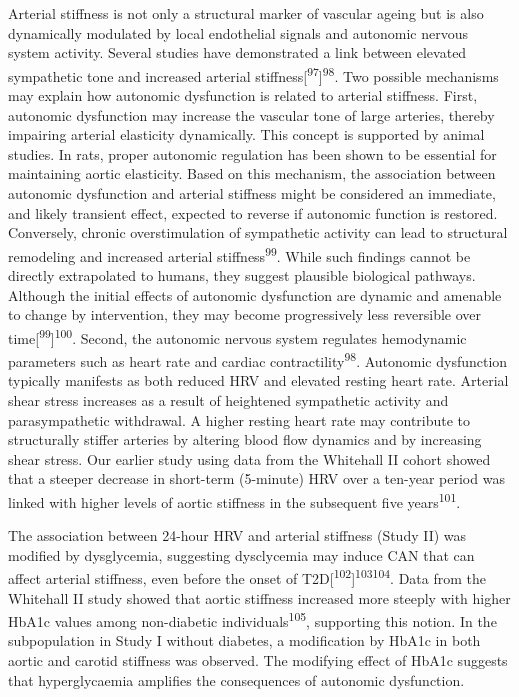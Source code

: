 \documentclass[
  letterpaper,
  headsepline=true,
  open=any]{scrbook}
\begin{document}
Arterial stiffness is not only a structural marker of vascular ageing
but is also dynamically modulated by local endothelial signals and
autonomic nervous system activity. Several studies have demonstrated a
link between elevated sympathetic tone and increased arterial
stiffness{[}\textsuperscript{97}{]}\textsuperscript{98}. Two possible
mechanisms may explain how autonomic dysfunction is related to arterial
stiffness. First, autonomic dysfunction may increase the vascular tone
of large arteries, thereby impairing arterial elasticity dynamically.
This concept is supported by animal studies. In rats, proper autonomic
regulation has been shown to be essential for maintaining aortic
elasticity. Based on this mechanism, the association between autonomic
dysfunction and arterial stiffness might be considered an immediate, and
likely transient effect, expected to reverse if autonomic function is
restored. Conversely, chronic overstimulation of sympathetic activity
can lead to structural remodeling and increased arterial
stiffness\textsuperscript{99}. While such findings cannot be directly
extrapolated to humans, they suggest plausible biological pathways.
Although the initial effects of autonomic dysfunction are dynamic and
amenable to change by intervention, they may become progressively less
reversible over time{[}\textsuperscript{99}{]}\textsuperscript{100}.
Second, the autonomic nervous system regulates hemodynamic parameters
such as heart rate and cardiac contractility\textsuperscript{98}.
Autonomic dysfunction typically manifests as both reduced HRV and
elevated resting heart rate. Arterial shear stress increases as a result
of heightened sympathetic activity and parasympathetic withdrawal. A
higher resting heart rate may contribute to structurally stiffer
arteries by altering blood flow dynamics and by increasing shear stress.
Our earlier study using data from the Whitehall II cohort showed that a
steeper decrease in short-term (5-minute) HRV over a ten-year period was
linked with higher levels of aortic stiffness in the subsequent five
years\textsuperscript{101}.

The association between 24-hour HRV and arterial stiffness (Study II)
was modified by dysglycemia, suggesting dysclycemia may induce CAN that
can affect arterial stiffness, even before the onset of
T2D{[}\textsuperscript{102}{]}\textsuperscript{103}\textsuperscript{104}.
Data from the Whitehall II study showed that aortic stiffness increased
more steeply with higher HbA1c values among non-diabetic
individuals\textsuperscript{105}, supporting this notion. In the
subpopulation in Study I without diabetes, a modification by HbA1c in
both aortic and carotid stiffness was observed. The modifying effect of
HbA1c suggests that hyperglycaemia amplifies the consequences of
autonomic dysfunction.
\end{document}
